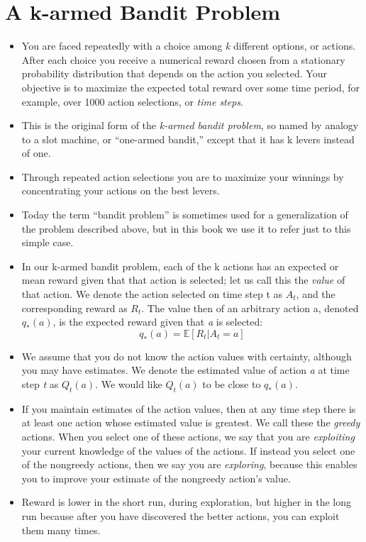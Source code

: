 \documentclass{article}
\begin{document}
\section{A k-armed Bandit Problem}
\begin{itemize}
    \item You are faced repeatedly with a choice among \emph{k} different options, or actions. After each choice you receive a numerical reward chosen from a stationary probability distribution that depends on the action you selected. Your objective is to maximize the expected total reward over some time period, for example, over 1000 action selections, or \emph{time steps}.
    \item This is the original form of the \emph{k-armed bandit problem}, so named by analogy to a slot machine, or “one-armed bandit,” except that it has k levers instead of one.
    \item Through repeated action selections you are to maximize your winnings by concentrating your actions on the best levers.
    \item Today the term “bandit problem” is sometimes used for a generalization of the problem described above, but in this book we use it to refer just to this simple case.
    \item In our k-armed bandit problem, each of the k actions has an expected or mean reward given that that action is selected; let us call this the \emph{value} of that action. We denote the action selected on time step t as $A_t$, and the corresponding reward as $R_t$. The value then of an arbitrary action a, denoted $q_*(a)$, is the expected reward given that \emph{a} is selected: $$ q_*(a) = \mathbb{E}[R_t | A_t = a] $$
    \item We assume that you do not know the action values with certainty, although you may have estimates. We denote the estimated value of action \emph{a} at time step \emph{t} as $Q_t(a)$. We would like $Q_t(a)$ to be close to $q_*(a)$.
    \item If you maintain estimates of the action values, then at any time step there is at least one action whose estimated value is greatest. We call these the \emph{greedy} actions. When you select one of these actions, we say that you are \emph{exploiting} your current knowledge of the values of the actions. If instead you select one of the nongreedy actions, then we say you are \emph{exploring}, because this enables you to improve your estimate of the nongreedy action's value.
    \item Reward is lower in the short run, during exploration, but higher in the long run because after you have discovered the better actions, you can exploit them many times.
\end{itemize}
\end{document}
